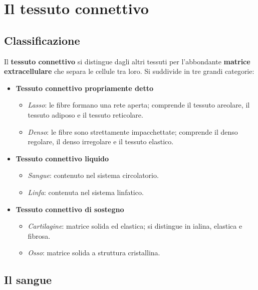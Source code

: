 \chapter{Il tessuto connettivo}

\section{Classificazione}

Il \textbf{tessuto connettivo} si distingue dagli altri tessuti per l'abbondante
\textbf{matrice extracellulare} che separa le cellule tra loro. Si suddivide in
tre grandi categorie:

\begin{itemize}
  \item \textbf{Tessuto connettivo propriamente detto}
    \begin{itemize}
      \item \textit{Lasso}: le fibre formano una rete aperta; comprende il
        tessuto areolare, il tessuto adiposo e il tessuto reticolare.
      \item \textit{Denso}: le fibre sono strettamente impacchettate; comprende
        il denso regolare, il denso irregolare e il tessuto elastico.
    \end{itemize}
  \item \textbf{Tessuto connettivo liquido}
    \begin{itemize}
      \item \textit{Sangue}: contenuto nel sistema circolatorio.
      \item \textit{Linfa}: contenuta nel sistema linfatico.
    \end{itemize}
  \item \textbf{Tessuto connettivo di sostegno}
    \begin{itemize}
      \item \textit{Cartilagine}: matrice solida ed elastica; si distingue in
        ialina, elastica e fibrosa.
      \item \textit{Osso}: matrice solida a struttura cristallina.
    \end{itemize}
\end{itemize}

\section{Il sangue}

